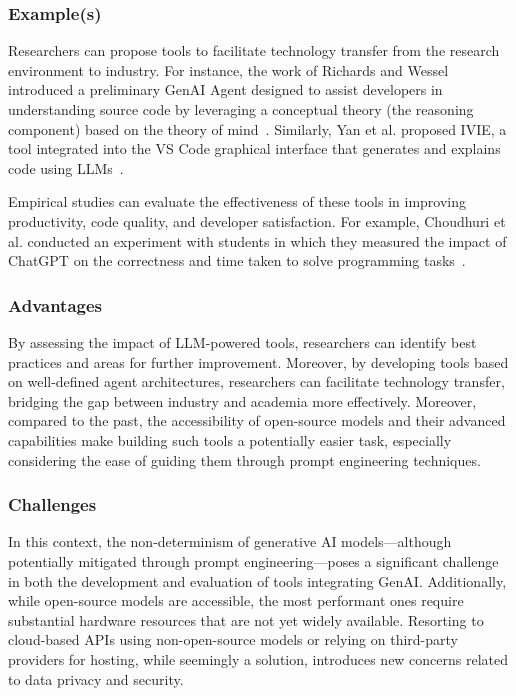 \documentclass[11pt]{article}
\begin{document}
\subsubsection{Example(s)}

Researchers can propose tools to facilitate technology transfer from the research environment to industry. 
For instance, the work of Richards and Wessel introduced a preliminary GenAI Agent designed to assist developers in understanding source code by leveraging a conceptual theory (the reasoning component) based on the theory of mind~\cite{DBLP:conf/icsm/RichardsW24}. 
Similarly, Yan et al. proposed IVIE, a tool integrated into the VS Code graphical interface that generates and explains code using LLMs~\cite{DBLP:conf/chi/YanHWH24}.

Empirical studies can evaluate the effectiveness of these tools in improving productivity, code quality, and developer satisfaction. 
For example, Choudhuri et al. conducted an experiment with students in which they measured the impact of ChatGPT on the correctness and time taken to solve programming tasks~\cite{DBLP:conf/icse/ChoudhuriLSGS24}.

\subsubsection{Advantages}

By assessing the impact of LLM-powered tools, researchers can identify best practices and areas for further improvement.
Moreover, by developing tools based on well-defined agent architectures, researchers can facilitate technology transfer, bridging the gap between industry and academia more effectively. Moreover, compared to the past, the accessibility of open-source models and their advanced capabilities make building such tools a potentially easier task, especially considering the ease of guiding them through prompt engineering techniques.

\subsubsection{Challenges}


In this context, the non-determinism of generative AI models—although potentially mitigated through prompt engineering—poses a significant challenge in both the development and evaluation of tools integrating GenAI. 
Additionally, while open-source models are accessible, the most performant ones require substantial hardware resources that are not yet widely available. Resorting to cloud-based APIs using non-open-source models or relying on third-party providers for hosting, while seemingly a solution, introduces new concerns related to data privacy and security.
\end{document}
